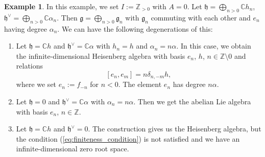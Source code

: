 \documentclass[11pt]{amsart}
\renewcommand{\le}{\leqslant}
\renewcommand{\ge}{\geqslant}
\newcommand{\C}{\mathbb{C}}
\newcommand{\Z}{\mathbb{Z}}
\newcommand{\g}{\mathfrak{g}}
\newcommand{\h}{\mathfrak{h}}
\numberwithin{equation}{section}
\theoremstyle{plain}
\theoremstyle{definition}
\newtheorem{example}[theorem]{Example}
\begin{document}
\begin{example}\label{e:Heisenberg_degenerations}
    In this example, we set $I:=\Z_{>0}$ with $A=0$. Let $\h=\bigoplus_{n>0}\C h_n$, $\h^\vee=\bigoplus_{n>0}\C \alpha_n$. Then $\g=\bigoplus_{n>0} \g_n$ with $\g_n$ commuting with each other and $e_n$ having degree $\alpha_n$. We can have the following degenerations of this:
    \begin{enumerate}[label=(\roman*)]
        \item Let $\h=\C h$ and $\h^\vee=\C\alpha$ with $h_n=h$ and $\alpha_n=n\alpha$. In this case, we obtain the infinite-dimensional Heisenberg algebra with basis $e_n$, $h$, $n\in\Z\setminus0$ and relations
        $$
        [e_n,e_m]=n\delta_{n,-m}h,
        $$
        where we set $e_n:=f_{-n}$ for $n<0$.
        The element $e_n$ has degree $n\alpha$.
        \item Let $\h=0$ and $\h^\vee=\C\alpha$ with $\alpha_n=n\alpha$. Then we get the abelian Lie algebra with basis $e_n$, $n\in\Z$.
        \item Let $\h=\C h$ and $\h^\vee=0$. The construction gives us the Heisenberg algebra, but the condition (\ref{eq:finiteness_condition}) is not satisfied and we have an infinite-dimensional zero root space.
    \end{enumerate}
\end{example}




\end{document}
